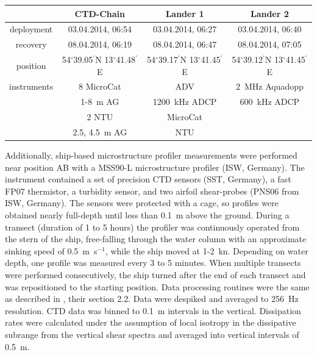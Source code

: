 \begin{table}
\begin{center}
\begin{tabular}{cccc}
& CTD-Chain & Lander 1 & Lander 2 \\
\hline
 deployment & 03.04.2014, 06:54 & 03.04.2014, 06:27 & 03.04.2014, 06:40 \\ 
 recovery & 08.04.2014, 06:19 & 08.04.2014, 06:47 & 08.04.2014, 07:05 \\
\hline
position & 54$^\circ$39.05$^\prime$N 13$^\circ$41.48$^\prime$E & 
54$^\circ$39.17$^\prime$N 13$^\circ$41.45$^\prime$E & 54$^\circ$39.12$^\prime$N 
13$^\circ$41.45$^\prime$E \\
\hline
instruments & 8 MicroCat & ADV & 2~MHz Aquadopp \\
 & 1-8~m AG & 1200~kHz ADCP & 600~kHz ADCP\\
 & 2 NTU & MicroCat & \\
 & 2.5, 4.5~m AG & NTU & \\
 \end{tabular}
\end{center}
\end{table}

Additionally, ship-based microstructure profiler measurements were performed 
near position AB with a MSS90-L microstructure profiler (ISW, Germany). The 
instrument contained a set of 
precision CTD sensors (SST, Germany), a fast FP07 thermistor, a turbidity 
sensor, and two airfoil shear-probes (PNS06 from ISW, Germany). The 
sensors were protected with a cage, so profiles were obtained nearly full-depth 
until less than 0.1~m above the ground. During a transect (duration of 1 to 5 
hours) the profiler was continuously operated from the stern of the ship, 
free-falling through the water column with an approximate sinking speed of 
0.5~m~s$^{-1}$, while the ship moved at 1-2~kn. Depending on water depth, one 
profile was measured every 3 to 5 minutes. When multiple transects 
were performed consecutively, the ship turned after the end of each transect 
and was repositioned to the starting position. 
Data processing routines were the same as described in \cite{vanderlee2011}, 
their section 2.2. Data were despiked and averaged to 256~Hz resolution. 
CTD data was binned to 0.1~m intervals in the vertical. Dissipation rates were 
calculated under the assumption of local isotropy in the dissipative subrange 
from the vertical shear spectra and averaged into vertical intervals of 0.5~m.

